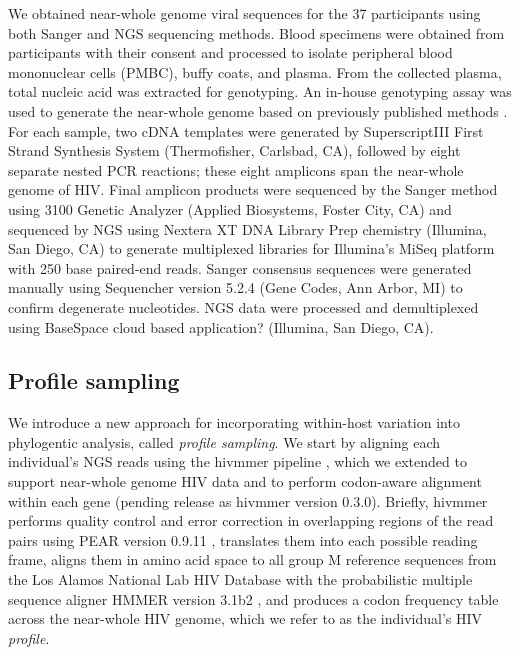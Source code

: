 \documentclass[letterpaper]{article}
\begin{document}
We obtained near-whole genome viral sequences for the 37 participants using both Sanger and NGS sequencing methods. Blood specimens were obtained from participants with their consent and processed to isolate peripheral blood mononuclear cells (PMBC), buffy coats, and plasma. From the collected plasma, total nucleic acid was extracted for genotyping. An in-house genotyping assay was used to generate the near-whole genome based on previously published methods \parencite{nadai, di_giallonardo}. For each sample, two cDNA templates were generated by SuperscriptIII First Strand Synthesis System (Thermofisher, Carlsbad, CA), followed by eight separate nested PCR reactions; these eight amplicons span the near-whole genome of HIV.  Final amplicon products were sequenced by the Sanger method using 3100 Genetic Analyzer (Applied Biosystems, Foster City, CA) and sequenced by NGS using Nextera XT DNA Library Prep chemistry (Illumina, San Diego, CA) to generate multiplexed libraries for Illumina's MiSeq platform with 250 base paired-end reads. Sanger consensus sequences were generated manually using Sequencher version 5.2.4 (Gene Codes, Ann Arbor, MI) to confirm degenerate nucleotides. NGS data were processed and demultiplexed using BaseSpace cloud based application? (Illumina, San Diego, CA).

\subsection*{Profile sampling}

We introduce a new approach for incorporating within-host variation into phylogentic analysis, called \emph{profile sampling}. We start by aligning each individual's NGS reads using the hivmmer pipeline \parencite{howison}, which we extended to support near-whole genome HIV data and to perform codon-aware alignment within each gene (pending release as hivmmer version 0.3.0). Briefly, hivmmer performs quality control and error correction in overlapping regions of the read pairs using PEAR version 0.9.11 \parencite{zhang}, translates them into each possible reading frame, aligns them in amino acid space to all group M reference sequences from the Los Alamos National Lab HIV Database with the probabilistic multiple sequence aligner HMMER version 3.1b2 \parencite{eddy}, and produces a codon frequency table across the near-whole HIV genome, which we refer to as the individual's HIV \emph{profile}.
\end{document}
